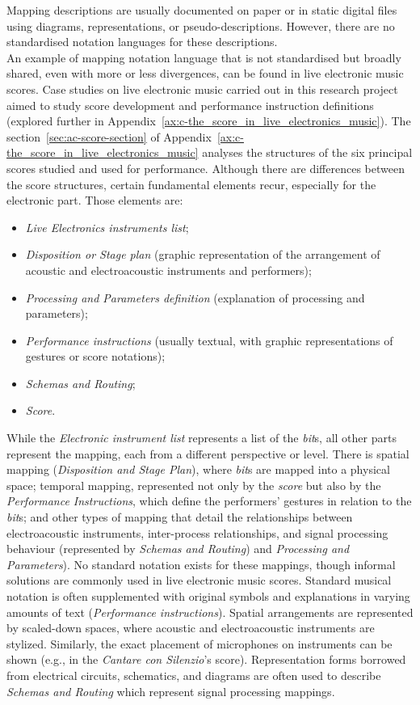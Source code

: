 Mapping descriptions are usually documented on paper or in static digital files using diagrams, representations, or pseudo-descriptions. However, there are no standardised notation languages for these descriptions.\\
An example of mapping notation language that is not standardised but broadly shared, even with more or less divergences, can be found in live electronic music scores. Case studies on live electronic music carried out in this research project aimed to study score development and performance instruction definitions (explored further in Appendix~\ref{ax:c-the_score_in_live_electronics_music}). The section~\ref{sec:ac-score-section} of Appendix~\ref{ax:c-the_score_in_live_electronics_music} analyses the structures of the six principal scores studied and used for performance. Although there are differences between the score structures, certain fundamental elements recur, especially for the electronic part. Those elements are:
\begin{itemize}
    \item \textit{Live Electronics instruments list};
    \item \textit{Disposition or Stage plan} (graphic representation of the arrangement of acoustic and electroacoustic instruments and performers);
    \item \textit{Processing and Parameters definition} (explanation of processing and parameters);
    \item \textit{Performance instructions} (usually textual, with graphic representations of gestures or score notations);
    \item \textit{Schemas and Routing};
    \item \textit{Score}.
\end{itemize}
While the \textit{Electronic instrument list} represents a list of the \textit{bit}s, all other parts represent the mapping, each from a different perspective or level. There is spatial mapping (\textit{Disposition and Stage Plan}), where \textit{bit}s are mapped into a physical space; temporal mapping, represented not only by the \textit{score} but also by the \textit{Performance Instructions}, which define the performers' gestures in relation to the \textit{bit}s; and other types of mapping that detail the relationships between electroacoustic instruments, inter-process relationships, and signal processing behaviour (represented by \textit{Schemas and Routing}) and \textit{Processing and Parameters}). No standard notation exists for these mappings, though informal solutions are commonly used in live electronic music scores. Standard musical notation is often supplemented with original symbols and explanations in varying amounts of text (\textit{Performance instructions}). Spatial arrangements are represented by scaled-down spaces, where acoustic and electroacoustic instruments are stylized. Similarly, the exact placement of microphones on instruments can be shown (e.g., in the \textit{Cantare con Silenzio}’s score). Representation forms borrowed from electrical circuits, schematics, and diagrams are often used to describe \textit{Schemas and Routing} which represent signal processing mappings.\\
